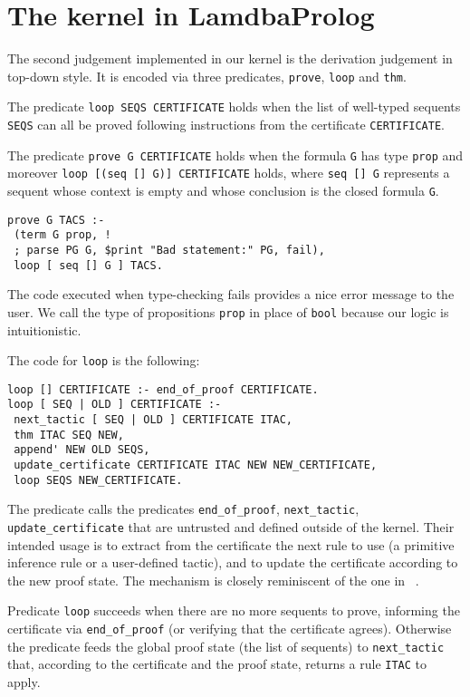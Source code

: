 \documentclass[preprint]{sigplanconf}
\begin{document}
\section{The kernel in LamdbaProlog}
The second judgement implemented in our kernel is the derivation judgement in top-down style. It is encoded via three predicates, \verb+prove+, \verb+loop+ and \verb+thm+.

The predicate \verb+loop SEQS CERTIFICATE+ holds when the list of well-typed sequents \verb+SEQS+ can all be proved following instructions from the certificate \verb+CERTIFICATE+.

The predicate \verb+prove G CERTIFICATE+ holds when the formula \verb+G+ has type \verb+prop+ and moreover \verb+loop [(seq [] G)] CERTIFICATE+ holds, where \verb+seq [] G+ represents a sequent whose context is empty and whose conclusion is the closed formula \verb+G+.
\begin{small}
\begin{verbatim}
prove G TACS :-
 (term G prop, !
 ; parse PG G, $print "Bad statement:" PG, fail),
 loop [ seq [] G ] TACS.
\end{verbatim}
\end{small}
The code executed when type-checking fails provides a nice error message to the user. We call the type of propositions \verb+prop+ in place of \verb+bool+ because our logic is intuitionistic.

The code for \verb+loop+ is the following:
\begin{small}
\begin{verbatim}
loop [] CERTIFICATE :- end_of_proof CERTIFICATE.
loop [ SEQ | OLD ] CERTIFICATE :-
 next_tactic [ SEQ | OLD ] CERTIFICATE ITAC,
 thm ITAC SEQ NEW,
 append' NEW OLD SEQS,
 update_certificate CERTIFICATE ITAC NEW NEW_CERTIFICATE,
 loop SEQS NEW_CERTIFICATE.
\end{verbatim}
\end{small}
The predicate calls the predicates \verb+end_of_proof+, \verb+next_tactic+, \verb+update_certificate+ that are untrusted and defined outside of the kernel. Their intended usage is to extract from the certificate the next rule to use (a primitive inference rule or a user-defined tactic), and to update the certificate according to the new proof state. The mechanism is closely reminiscent of the one in ~\cite{zak2}.

Predicate \verb+loop+ succeeds when there are no more sequents to prove, informing the certificate via \verb+end_of_proof+ (or verifying that the certificate agrees). Otherwise the predicate feeds the global proof state (the list of sequents) to \verb+next_tactic+ that, according to the certificate and the proof state, returns a rule \verb+ITAC+ to apply.
\end{document}
